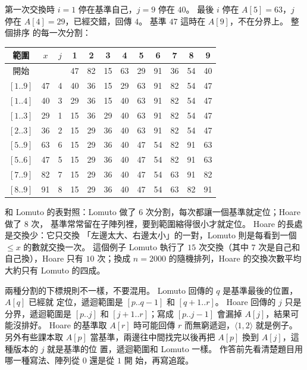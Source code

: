 第一次交換時 $i = 1$ 停在基準自己，$j = 9$ 停在 $40$。 最後 $i$ 停在 $A[5] = 63$，$j$
停在 $A[4] = 29$，已經交錯，回傳 $4$。 基準 $47$ 這時在 $A[9]$，不在分界上。 整個排序
的每一次分割：

\begin{center}
\begin{tabular}{ccc*{9}{c}}
\toprule
範圍 & $x$ & $j$ & 1 & 2 & 3 & 4 & 5 & 6 & 7 & 8 & 9 \\
\midrule
開始 & & & 47 & 82 & 15 & 63 & 29 & 91 & 36 & 54 & 40 \\
$[1..9]$ & 47 & 4 & 40 & 36 & 15 & 29 & 63 & 91 & 82 & 54 & 47 \\
$[1..4]$ & 40 & 3 & 29 & 36 & 15 & 40 & 63 & 91 & 82 & 54 & 47 \\
$[1..3]$ & 29 & 1 & 15 & 36 & 29 & 40 & 63 & 91 & 82 & 54 & 47 \\
$[2..3]$ & 36 & 2 & 15 & 29 & 36 & 40 & 63 & 91 & 82 & 54 & 47 \\
$[5..9]$ & 63 & 6 & 15 & 29 & 36 & 40 & 47 & 54 & 82 & 91 & 63 \\
$[5..6]$ & 47 & 5 & 15 & 29 & 36 & 40 & 47 & 54 & 82 & 91 & 63 \\
$[7..9]$ & 82 & 7 & 15 & 29 & 36 & 40 & 47 & 54 & 63 & 91 & 82 \\
$[8..9]$ & 91 & 8 & 15 & 29 & 36 & 40 & 47 & 54 & 63 & 82 & 91 \\
\bottomrule
\end{tabular}
\end{center}

和 Lomuto 的表對照：Lomuto 做了 6 次分割，每次都讓一個基準就定位；Hoare 做了 8 次，
基準常常留在子陣列裡，要到範圍縮得很小才就定位。 Hoare 的長處是交換少：它只交換
「左邊太大、右邊太小」的一對，Lomuto 則是每看到一個 $\le x$ 的數就交換一次。 這個例子
Lomuto 執行了 $15$ 次交換（其中 $7$ 次是自己和自己換），Hoare 只有 $10$ 次；換成
$n = 2000$ 的隨機排列，Hoare 的交換次數平均大約只有 Lomuto 的四成。

\begin{examnote}
兩種分割的下標規則不一樣，不要混用。 Lomuto 回傳的 $q$ 是基準最後的位置，$A[q]$ 已經就
定位，遞迴範圍是 $[p..q-1]$ 和 $[q+1..r]$。 Hoare 回傳的 $j$ 只是分界，遞迴範圍是
$[p..j]$ 和 $[j+1..r]$；寫成 $[p..j-1]$ 會漏掉 $A[j]$，結果可能沒排好。 Hoare 的基準取
$A[r]$ 時可能回傳 $r$ 而無窮遞迴，$\langle 1, 2 \rangle$ 就是例子。 另外有些課本取
$A[p]$ 當基準，兩邊往中間找完以後再把 $A[p]$ 換到 $A[j]$，這種版本的 $j$ 就是基準的位
置，遞迴範圍和 Lomuto 一樣。 作答前先看清楚題目用哪一種寫法、陣列從 $0$ 還是從 $1$ 開
始，再寫追蹤。
\end{examnote}

